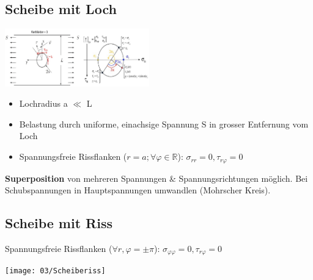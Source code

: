     \subsection{Scheibe mit Loch}
    \vspace{-0.5mm}
        \begin{center}
            \includegraphics[width=\linewidth, height=25mm]{images/03/mohr_and_loch.jpeg}
        \end{center}
        \vspace{-3mm}
        \begin{itemize}
            \item Lochradius a $\ll$ L
            \item Belastung durch uniforme, einachsige Spannung S in grosser Entfernung vom Loch
            \item Spannungsfreie Rissflanken ($r = a; \forall\varphi\in\mathbb{R} $): $\sigma_{rr}=0, \tau_{r\varphi}=0$
        \end{itemize}
        \vspace{-2mm}
        \textbf{Superposition} von mehreren Spannungen \& Spannungsrichtungen möglich. Bei Schubspannungen in Hauptspannungen umwandlen (Mohrscher Kreis).
    \subsection{Scheibe mit Riss}
        Spannungsfreie Rissflanken ($\forall r, \varphi=\pm\pi$): $\sigma_{\varphi\varphi}=0, \tau_{r\varphi}=0$
        \begin{center}
            \vspace{-2mm}
            \texttt{[image: 03/Scheiberiss]}
        \end{center}